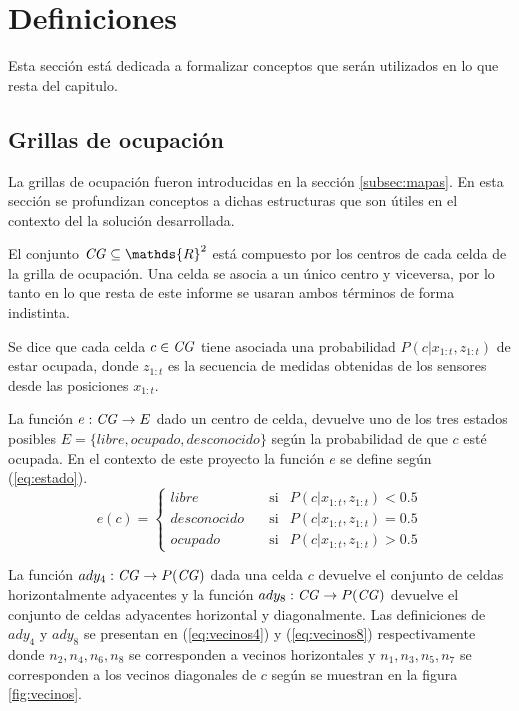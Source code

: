 \section{Definiciones} \label{sec:def}
Esta sección está dedicada a formalizar conceptos que serán utilizados en lo
que resta del capitulo.

\subsection{Grillas de ocupación}\label{subsec:Grilla}
La grillas de ocupación fueron introducidas en la sección \ref{subsec:mapas}.
En esta sección se profundizan conceptos a dichas estructuras que son útiles en
el contexto del la solución desarrollada.

El conjunto $\mli{CG}\subseteq \mathds{R}^2$ está compuesto por los centros de cada
celda de la grilla de ocupación. Una celda se asocia a un único centro y
viceversa, por lo tanto en lo que resta de este informe se usaran ambos
términos de forma indistinta.

Se dice que cada celda $c\in \mathit{CG}$ tiene asociada una probabilidad $P(c|x_{1:t},z_{1:t})$
de estar ocupada, donde $z_{1:t}$ es la secuencia de medidas obtenidas de los
sensores desde las posiciones $x_{1:t}$.

La función $e : \mathit{CG} \rightarrow E$ dado un centro de celda, devuelve uno
de los tres estados posibles $E=\{libre, ocupado, desconocido\}$ según la
probabilidad de que $c$ esté ocupada. En el contexto de este proyecto la
función $e$ se define según
(\ref{eq:estado}).
\begin{equation} 
  e(c)= 
  \left \{ 
    \begin{aligned}
       libre       &\ \ \ \text{ si}& P(c|x_{1:t},z_{1:t}) < 0.5 \\
       desconocido &\ \ \ \text{ si}& P(c|x_{1:t},z_{1:t}) = 0.5 \\
       ocupado     &\ \ \ \text{ si}& P(c|x_{1:t},z_{1:t}) > 0.5
    \end{aligned}
  \right .
  \label{eq:estado}
\end{equation}

La función $ady_4 : \mathit{CG} \rightarrow P(\mathit{CG})$ dada una celda $c$ devuelve el conjunto
de celdas horizontalmente adyacentes y la función $ady_8 : \mathit{CG} \rightarrow P(\mathit{CG})$
devuelve el conjunto de celdas adyacentes horizontal y diagonalmente. Las
definiciones de $ady_4$ y $ady_8$ se presentan en (\ref{eq:vecinos4}) y
(\ref{eq:vecinos8}) respectivamente donde $n_2, n_4, n_6, n_8$ se corresponden
a vecinos horizontales y $n_1, n_3, n_5, n_7$ se corresponden a los vecinos
diagonales de $c$ según se muestran en la figura \ref{fig:vecinos}.

